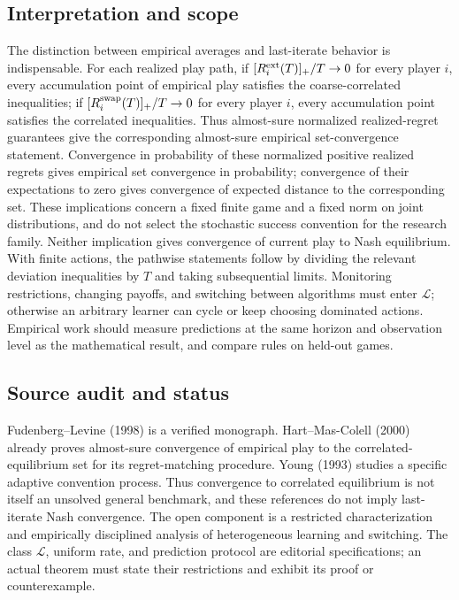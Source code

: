 \documentclass[11pt,a4paper]{article}
\begin{document}
\subsection*{Interpretation and scope}

The distinction between empirical averages and last-iterate behavior is indispensable. For each realized play path, if $[R_i^{\rm ext}(T)]_+/T\to0$ for every player $i$, every accumulation point of empirical play satisfies the coarse-correlated inequalities; if $[R_i^{\rm swap}(T)]_+/T\to0$ for every player $i$, every accumulation point satisfies the correlated inequalities. Thus almost-sure normalized realized-regret guarantees give the corresponding almost-sure empirical set-convergence statement. Convergence in probability of these normalized positive realized regrets gives empirical set convergence in probability; convergence of their expectations to zero gives convergence of expected distance to the corresponding set. These implications concern a fixed finite game and a fixed norm on joint distributions, and do not select the stochastic success convention for the research family. Neither implication gives convergence of current play to Nash equilibrium. With finite actions, the pathwise statements follow by dividing the relevant deviation inequalities by $T$ and taking subsequential limits. Monitoring restrictions, changing payoffs, and switching between algorithms must enter $\mathcal L$; otherwise an arbitrary learner can cycle or keep choosing dominated actions. Empirical work should measure predictions at the same horizon and observation level as the mathematical result, and compare rules on held-out games.

\subsection*{Source audit and status}

Fudenberg--Levine (1998) is a verified monograph. Hart--Mas-Colell (2000) already proves almost-sure convergence of empirical play to the correlated-equilibrium set for its regret-matching procedure. Young (1993) studies a specific adaptive convention process. Thus convergence to correlated equilibrium is not itself an unsolved general benchmark, and these references do not imply last-iterate Nash convergence. The open component is a restricted characterization and empirically disciplined analysis of heterogeneous learning and switching. The class $\mathcal L$, uniform rate, and prediction protocol are editorial specifications; an actual theorem must state their restrictions and exhibit its proof or counterexample.
\end{document}
